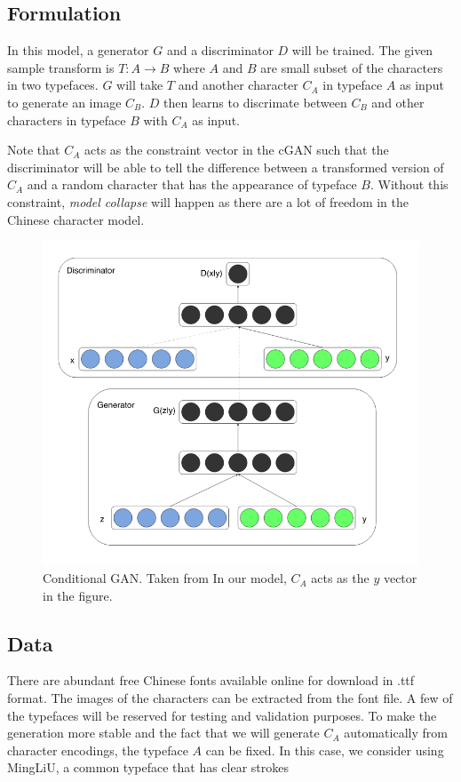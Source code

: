\documentclass[10pt,twocolumn,letterpaper]{article}
\begin{document}
\subsection{Formulation}
In this model, a generator $G$ and a discriminator $D$ will be trained. The given sample transform is $T:{A\to B}$ where $A$ and $B$ are small subset of the characters in two typefaces. $G$ will take $T$ and another character $C_A$ in typeface $A$ as input to generate an image $C_B$. $D$ then learns to discrimate between $C_B$ and other characters in typeface $B$ with $C_A$ as input. 

Note that $C_A$ acts as the constraint vector in the cGAN such that the discriminator will be able to tell the difference between a transformed version of $C_A$ and a random character that has the appearance of typeface $B$. Without this constraint, \textit{model collapse} will happen as there are a lot of freedom in the Chinese character model.

\begin{figure}[t]
	\begin{center}
		\includegraphics[width=0.8\linewidth]{img.png}
	\end{center}
	\caption{Conditional GAN. Taken from \cite{Authors01} In our model, $C_A$ acts as the $y$ vector in the figure.}
	\label{fig:long}
	\label{fig:onecol}
\end{figure}

\subsection{Data}
There are abundant free Chinese fonts available online for download in .ttf format. The images of the characters can be extracted from the font file. A few of the typefaces will be reserved for testing and validation purposes. To make the generation more stable and the fact that we will generate $C_A$ automatically from character encodings, the typeface $A$ can be fixed. In this case, we consider using MingLiU, a common typeface that has clear strokes



{\small


}
\end{document}
